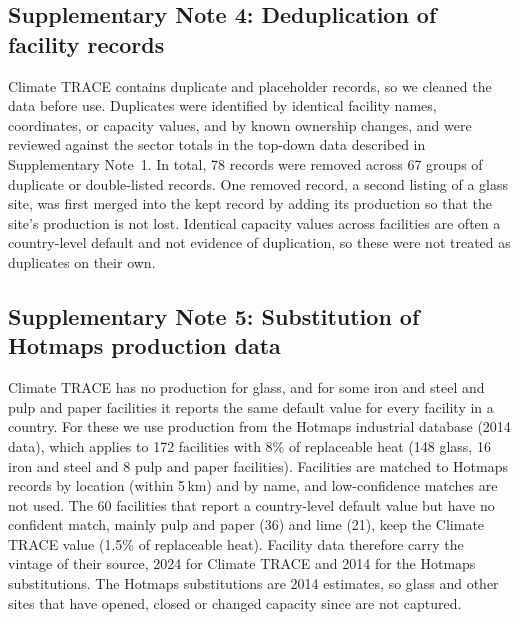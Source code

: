 \documentclass[11pt]{article}
\begin{document}
\subsection*{Supplementary Note 4: Deduplication of facility records}
Climate TRACE contains duplicate and placeholder records, so we cleaned the data before use. Duplicates were identified by identical facility names, coordinates, or capacity values, and by known ownership changes, and were reviewed against the sector totals in the top-down data described in Supplementary Note~1. In total, 78 records were removed across 67 groups of duplicate or double-listed records. One removed record, a second listing of a glass site, was first merged into the kept record by adding its production so that the site's production is not lost. Identical capacity values across facilities are often a country-level default and not evidence of duplication, so these were not treated as duplicates on their own.

\subsection*{Supplementary Note 5: Substitution of Hotmaps production data}
Climate TRACE has no production for glass, and for some iron and steel and pulp and paper facilities it reports the same default value for every facility in a country. For these we use production from the Hotmaps industrial database\cite{hotmaps2018} (2014 data), which applies to 172 facilities with 8\% of replaceable heat (148 glass, 16 iron and steel and 8 pulp and paper facilities). Facilities are matched to Hotmaps records by location (within 5\,km) and by name, and low-confidence matches are not used. The 60 facilities that report a country-level default value but have no confident match, mainly pulp and paper (36) and lime (21), keep the Climate TRACE value (1.5\% of replaceable heat). Facility data therefore carry the vintage of their source, 2024 for Climate TRACE and 2014 for the Hotmaps substitutions. The Hotmaps substitutions are 2014 estimates, so glass and other sites that have opened, closed or changed capacity since are not captured.
\end{document}
